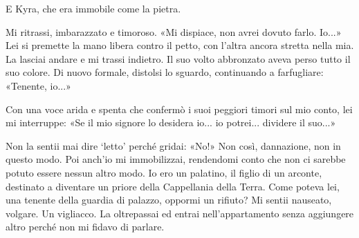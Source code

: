 E Kyra, che era immobile come la pietra.

Mi ritrassi, imbarazzato e timoroso. «Mi dispiace, non avrei dovuto
farlo. Io...» Lei si premette la mano libera contro il petto, con
l'altra ancora stretta nella mia. La lasciai andare e mi trassi
indietro. Il suo volto abbronzato aveva perso tutto il suo colore. Di
nuovo formale, distolsi lo sguardo, continuando a farfugliare: «Tenente,
io...»

Con una voce arida e spenta che confermò i suoi peggiori timori sul mio
conto, lei mi interruppe: «Se il mio signore lo desidera io... io
potrei... dividere il suo...»

Non la sentii mai dire `letto' perché gridai: «No!» Non così,
dannazione, non in questo modo. Poi anch'io mi immobilizzai, rendendomi
conto che non ci sarebbe potuto essere nessun altro modo. Io ero un
palatino, il figlio di un arconte, destinato a diventare un priore della
Cappellania della Terra. Come poteva lei, una tenente della guardia di
palazzo, oppormi un rifiuto? Mi sentii nauseato, volgare. Un vigliacco.
La oltrepassai ed entrai nell'appartamento senza aggiungere altro perché
non mi fidavo di parlare.

